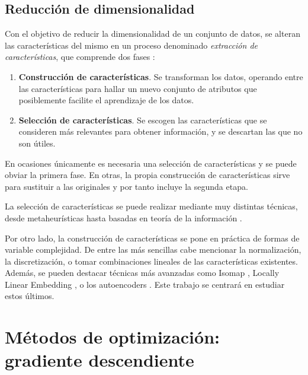 \subsection{Reducción de
dimensionalidad}\label{reducciuxf3n-de-dimensionalidad}

Con el objetivo de reducir la dimensionalidad de un conjunto de datos,
se alteran las características del mismo en un proceso denominado
\emph{extracción de características}, que comprende dos fases
\autocite{guyon2006}:

\begin{enumerate}
\def\labelenumi{\arabic{enumi}.}
\tightlist
\item
  \textbf{Construcción de características}. Se transforman los datos,
  operando entre las características para hallar un nuevo conjunto de
  atributos que posiblemente facilite el aprendizaje de los datos.
\item
  \textbf{Selección de características}. Se escogen las características
  que se consideren más relevantes para obtener información, y se
  descartan las que no son útiles.
\end{enumerate}

En ocasiones únicamente es necesaria una selección de características y
se puede obviar la primera fase. En otras, la propia construcción de
características sirve para sustituir a las originales y por tanto
incluye la segunda etapa.

La selección de características se puede realizar mediante muy distintas
técnicas, desde metaheurísticas hasta basadas en teoría de la
información \autocite{molina2002}.

Por otro lado, la construcción de características se pone en práctica de
formas de variable complejidad. De entre las más sencillas cabe
mencionar la normalización, la discretización, o tomar combinaciones
lineales de las características existentes. Además, se pueden destacar
técnicas más avanzadas como Isomap \autocite{tenenbaum2000}, Locally
Linear Embedding \autocite{roweis2000}, o los autoencoders
\autocite{hinton2006autoencoder}. Este trabajo se centrará en estudiar
estos últimos.

\section{Métodos de optimización: gradiente
descendiente}\label{muxe9todos-de-optimizaciuxf3n-gradiente-descendiente}

\label{sec:grad-desc}

